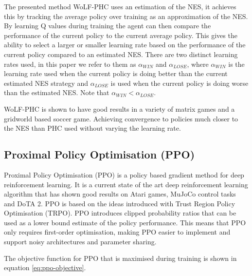 \documentclass[conference]{IEEEtran}
\newcommand\REVIEW[1]{{\color{blue} #1}}
\begin{document}
\REVIEW{
    The presented method WoLF-PHC uses an estimation of the NES, it achieves this by tracking the average policy over training as an approximation of the NES. By learning Q values during training the agent can then compare the performance of the current policy to the current average policy. This gives the ability to select a larger or smaller learning rate based on the performance of the current policy compared to an estimated NES. There are two distinct learning rates used, in this paper we refer to them as $\alpha_{WIN}$ and $\alpha_{LOSE}$, where $\alpha_{WIN}$ is the learning rate used when the current policy is doing better than the current estimated NES strategy and $\alpha_{LOSE}$ is used when the current policy is doing worse than the estimated NES. Note that $\alpha_{WIN} < \alpha_{LOSE}$.

WoLF-PHC is shown to have good results in a variety of matrix games and a gridworld based soccer game. Achieving convergence to policies much closer to the NES than PHC used without varying the learning rate.
}


\subsection{Proximal Policy Optimisation (PPO)}

Proximal Policy Optimisation (PPO) is a policy based gradient method for deep reinforcement learning. It is a current state of the art deep reinforcement learning algorithm that has shown good results on Atari games, MuJoCo control tasks\cite{schulman2017proximal} and DoTA 2\cite{OpenAI_dota}. PPO is based on the ideas introduced with Trust Region Policy Optimisation (TRPO)\cite{schulman2015trust}. PPO introduces clipped probability ratios that can be used as a lower bound estimate of the policy performance. This means that PPO only requires first-order optimisation, making PPO easier to implement and support noisy architectures and parameter sharing.


The objective function for PPO \REVIEW{that is maximised during training} is shown in equation \ref{eq:ppo-objective}.
\end{document}
